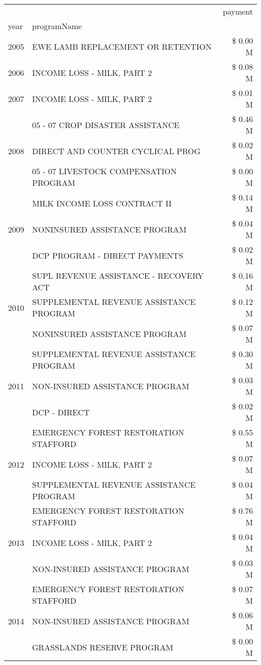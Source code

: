 \begin{tabular}{llr}
\toprule
 &  & payment \\
year & programName &  \\
\midrule
2005 & EWE LAMB REPLACEMENT OR RETENTION & \$ 0.00 M \\
\cline{1-3}
2006 & INCOME LOSS - MILK, PART 2 & \$ 0.08 M \\
\cline{1-3}
2007 & INCOME LOSS - MILK, PART 2 & \$ 0.01 M \\
\cline{1-3}
\multirow[t]{3}{*}{2008} & 05 - 07 CROP DISASTER ASSISTANCE & \$ 0.46 M \\
 & DIRECT AND COUNTER CYCLICAL PROG & \$ 0.02 M \\
 & 05 - 07 LIVESTOCK COMPENSATION PROGRAM & \$ 0.00 M \\
\cline{1-3}
\multirow[t]{3}{*}{2009} & MILK INCOME LOSS CONTRACT II & \$ 0.14 M \\
 & NONINSURED ASSISTANCE PROGRAM & \$ 0.04 M \\
 & DCP PROGRAM - DIRECT PAYMENTS & \$ 0.02 M \\
\cline{1-3}
\multirow[t]{3}{*}{2010} & SUPL REVENUE ASSISTANCE - RECOVERY ACT & \$ 0.16 M \\
 & SUPPLEMENTAL REVENUE ASSISTANCE PROGRAM & \$ 0.12 M \\
 & NONINSURED ASSISTANCE PROGRAM & \$ 0.07 M \\
\cline{1-3}
\multirow[t]{3}{*}{2011} & SUPPLEMENTAL REVENUE ASSISTANCE PROGRAM & \$ 0.30 M \\
 & NON-INSURED ASSISTANCE PROGRAM & \$ 0.03 M \\
 & DCP - DIRECT & \$ 0.02 M \\
\cline{1-3}
\multirow[t]{3}{*}{2012} & EMERGENCY FOREST RESTORATION STAFFORD & \$ 0.55 M \\
 & INCOME LOSS - MILK, PART 2 & \$ 0.07 M \\
 & SUPPLEMENTAL REVENUE ASSISTANCE PROGRAM & \$ 0.04 M \\
\cline{1-3}
\multirow[t]{3}{*}{2013} & EMERGENCY FOREST RESTORATION STAFFORD & \$ 0.76 M \\
 & INCOME LOSS - MILK, PART 2 & \$ 0.04 M \\
 & NON-INSURED ASSISTANCE PROGRAM & \$ 0.03 M \\
\cline{1-3}
\multirow[t]{3}{*}{2014} & EMERGENCY FOREST RESTORATION STAFFORD & \$ 0.07 M \\
 & NON-INSURED ASSISTANCE PROGRAM & \$ 0.06 M \\
 & GRASSLANDS RESERVE PROGRAM & \$ 0.00 M \\

\end{tabular}
